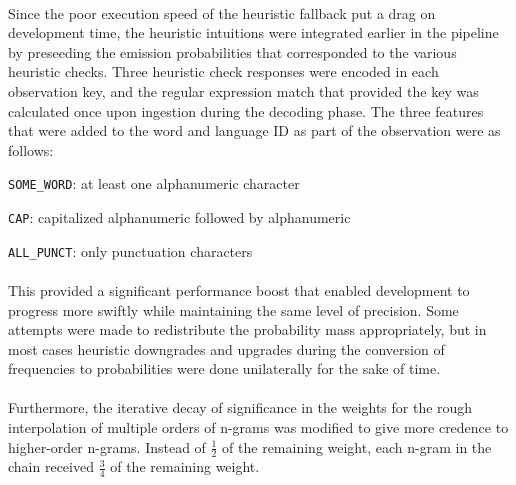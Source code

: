 \documentclass[11pt,a4paper]{article}
\begin{document}
\paragraph{}
Since the poor execution speed of the heuristic fallback put a drag on development time,
the heuristic intuitions were integrated earlier in the pipeline by preseeding the
emission probabilities that corresponded to the various heuristic checks. Three
heuristic check responses were encoded in each observation key, and the regular
expression match that provided the key was calculated once upon ingestion during
the decoding phase. The three features that were added to the word and language ID
as part of the observation were as follows:

\itemize
\item{\texttt{SOME\_WORD}: at least one alphanumeric character}
\item{\texttt{CAP}: capitalized alphanumeric followed by alphanumeric}
\item{\texttt{ALL\_PUNCT}: only punctuation characters }

\paragraph{}
This provided a significant performance boost that enabled development to progress
more swiftly while maintaining the same level of precision. Some attempts were made to
redistribute the probability mass appropriately, but in most cases heuristic downgrades
and upgrades during the conversion of frequencies to probabilities were done unilaterally
for the sake of time.

\paragraph{}
Furthermore, the iterative decay of significance in the weights for the rough
interpolation of multiple orders of n-grams was modified to give more credence
to higher-order n-grams. Instead of $\frac{1}{2}$ of the remaining weight, each n-gram
in the chain received $\frac{3}{4}$ of the remaining weight.
\end{document}

